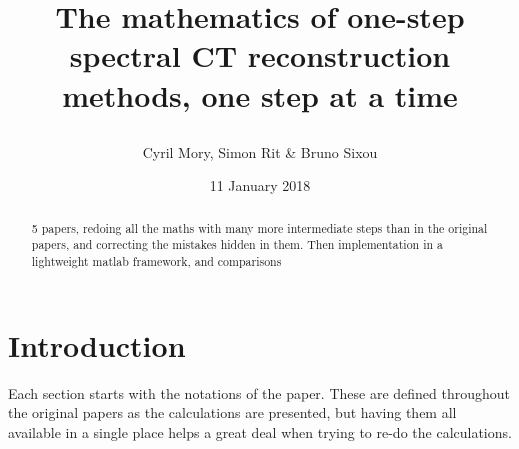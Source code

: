 \documentclass[a4paper, 10pt]{article}
\title{
\begin{center}
The mathematics of one-step spectral CT reconstruction methods, one step at a time
\end{center}
}
\author{Cyril Mory, Simon Rit \& Bruno Sixou}
\date{11 January 2018} %
\begin{document}
\maketitle

\begin{abstract}
5 papers, redoing all the maths with many more intermediate steps than in the original papers,
and correcting the mistakes hidden in them.
Then implementation in a lightweight matlab framework, and comparisons
\end{abstract}

\section{Introduction}
Each section starts with the notations of the paper. These are defined throughout the original papers as the calculations
are presented, but having them all available in a single place helps a great deal when trying to re-do the calculations.
\end{document}
